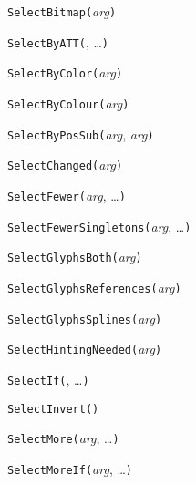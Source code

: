 
\noindent\texttt{SelectBitmap(}\textit{arg}\texttt{)}


\noindent\texttt{SelectByATT(}, \ldots\texttt{)}


\noindent\texttt{SelectByColor(}\textit{arg}\texttt{)}


\noindent\texttt{SelectByColour(}\textit{arg}\texttt{)}


\noindent\texttt{SelectByPosSub(}\textit{arg}, \textit{arg}\texttt{)}


\noindent\texttt{SelectChanged(}\textit{arg}\texttt{)}


\noindent\texttt{SelectFewer(}\textit{arg}, \ldots\texttt{)}


\noindent\texttt{SelectFewerSingletons(}\textit{arg}, \ldots\texttt{)}


\noindent\texttt{SelectGlyphsBoth(}\textit{arg}\texttt{)}


\noindent\texttt{SelectGlyphsReferences(}\textit{arg}\texttt{)}


\noindent\texttt{SelectGlyphsSplines(}\textit{arg}\texttt{)}


\noindent\texttt{SelectHintingNeeded(}\textit{arg}\texttt{)}


\noindent\texttt{SelectIf(}, \ldots\texttt{)}


\noindent\texttt{SelectInvert(}\texttt{)}


\noindent\texttt{SelectMore(}\textit{arg}, \ldots\texttt{)}


\noindent\texttt{SelectMoreIf(}\textit{arg}, \ldots\texttt{)}

